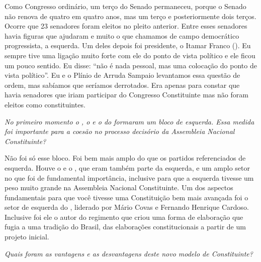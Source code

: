 Como Congresso ordinário, um terço do Senado permaneceu, porque o Senado
não renova de quatro em quatro anos, mas um terço e posteriormente dois
terços. Ocorre que 23 senadores foram eleitos no pleito anterior. Entre
esses senadores havia figuras que ajudaram e muito o que chamamos de
campo democrático progressista, a esquerda. Um deles depois foi
presidente, o Itamar Franco (). Eu sempre tive uma ligação muito
forte com ele do ponto de vista político e ele ficou um pouco sentido.
Eu disse: ``não é nada pessoal, mas uma colocação do ponto de vista
político''. Eu e o Plínio de Arruda Sampaio levantamos essa questão de
ordem, mas sabíamos que seríamos derrotados. Era apenas para constar que
havia senadores que iriam participar do Congresso Constituinte mas não
foram eleitos como constituintes.

\medskip

\emph{No primeiro momento o , o  e o do formaram um bloco de
esquerda. Essa medida foi importante para a coesão no processo decisório
da Assembleia Nacional Constituinte?}

Não foi só esse bloco. Foi bem mais amplo do que os
partidos referenciados de esquerda. Houve o  e o , que eram também
parte da esquerda, e um amplo setor no  que foi de fundamental
importância, inclusive para que a esquerda tivesse um peso muito grande
na Assembleia Nacional Constituinte. Um dos aspectos fundamentais para
que você tivesse uma Constituição bem mais avançada foi o setor de
esquerda do , liderado por Mário Covas e Fernando Henrique Cardoso.
Inclusive foi ele o autor do regimento que criou uma forma de elaboração
que fugia a uma tradição do Brasil, das elaborações constitucionais a
partir de um projeto inicial.

\medskip

\emph{Quais foram as vantagens e as desvantagens deste novo modelo de
Constituinte?}

